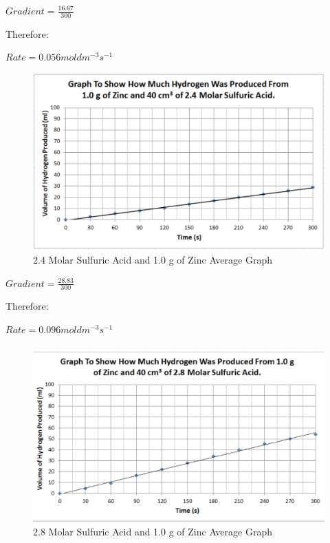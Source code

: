 $Gradient = \frac{16.67}{300}$

Therefore:

$Rate = 0.056 mol dm^{-3} s^{-1}$

\begin{figure}[H]
    \includegraphics[width=\textwidth]{./Analysis/Images/1NonCatalyst/24Molar.pdf}
    \caption{2.4 Molar Sulfuric Acid and 1.0 g of Zinc Average Graph} \label{fig:24MolarSAGradient}
\end{figure}

$Gradient = \frac{28.83}{300}$

Therefore:

$Rate = 0.096 mol dm^{-3} s^{-1}$

\begin{figure}[H]
    \includegraphics[width=\textwidth]{./Analysis/Images/1NonCatalyst/28Molar.pdf}
    \caption{2.8 Molar Sulfuric Acid and 1.0 g of Zinc Average Graph} \label{fig:28MolarSAGradient}
\end{figure}

